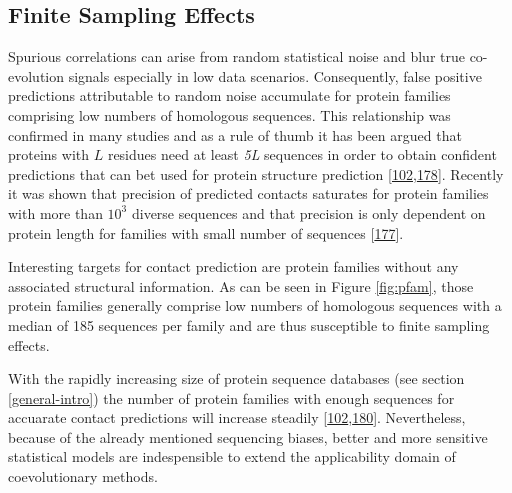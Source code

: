\documentclass[11pt,a4paper,twoside]{book}
\theoremstyle{definition}
\theoremstyle{definition}
\theoremstyle{remark}
\begin{document}
\subsection{Finite Sampling Effects}\label{finite-sampling-effects}

Spurious correlations can arise from random statistical noise and blur
true co-evolution signals especially in low data scenarios.
Consequently, false positive predictions attributable to random noise
accumulate for protein families comprising low numbers of homologous
sequences. This relationship was confirmed in many studies and as a rule
of thumb it has been argued that proteins with \(L\) residues need at
least \emph{5L} sequences in order to obtain confident predictions that
can bet used for protein structure prediction
{[}\protect\hyperlink{ref-Kamisetty2013}{102},\protect\hyperlink{ref-Marks2012}{178}{]}.
Recently it was shown that precision of predicted contacts saturates for
protein families with more than \(10^3\) diverse sequences and that
precision is only dependent on protein length for families with small
number of sequences {[}\protect\hyperlink{ref-Anishchenko2017}{177}{]}.

Interesting targets for contact prediction are protein families without
any associated structural information. As can be seen in Figure
\ref{fig:pfam}, those protein families generally comprise low numbers of
homologous sequences with a median of 185 sequences per family and are
thus susceptible to finite sampling effects.

With the rapidly increasing size of protein sequence databases (see
section \ref{general-intro}) the number of protein families with enough
sequences for accuarate contact predictions will increase steadily
{[}\protect\hyperlink{ref-Kamisetty2013}{102},\protect\hyperlink{ref-TheUniProtConsortium2013}{180}{]}.
Nevertheless, because of the already mentioned sequencing biases, better
and more sensitive statistical models are indespensible to extend the
applicability domain of coevolutionary methods.
\end{document}
